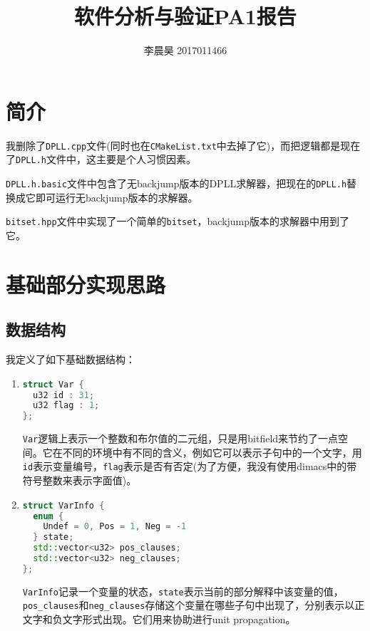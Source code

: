 \documentclass[12pt, UTF8]{article}
\title{软件分析与验证PA1报告}
\author{李晨昊 2017011466}
\begin{document}
\maketitle
\tableofcontents

\section{简介}

我删除了\lstinline|DPLL.cpp|文件(同时也在\lstinline|CMakeList.txt|中去掉了它)，而把逻辑都是现在了\lstinline|DPLL.h|文件中，这主要是个人习惯因素。

\lstinline|DPLL.h.basic|文件中包含了无backjump版本的DPLL求解器，把现在的\lstinline|DPLL.h|替换成它即可运行无backjump版本的求解器。

\lstinline|bitset.hpp|文件中实现了一个简单的\lstinline|bitset|，backjump版本的求解器中用到了它。

\section{基础部分实现思路}

\subsection{数据结构}

我定义了如下基础数据结构：

\begin{enumerate}
  \item
    \begin{lstlisting}[language = C++]
struct Var {
  u32 id : 31;
  u32 flag : 1;
};
    \end{lstlisting}

    \lstinline|Var|逻辑上表示一个整数和布尔值的二元组，只是用bitfield来节约了一点空间。它在不同的环境中有不同的含义，例如它可以表示子句中的一个文字，用\lstinline|id|表示变量编号，\lstinline|flag|表示是否有否定(为了方便，我没有使用dimacs中的带符号整数来表示字面值)。
  \item
    \begin{lstlisting}[language = C++]
struct VarInfo {
  enum {
    Undef = 0, Pos = 1, Neg = -1
  } state;
  std::vector<u32> pos_clauses;
  std::vector<u32> neg_clauses;
};
    \end{lstlisting}

    \lstinline|VarInfo|记录一个变量的状态，\lstinline|state|表示当前的部分解释中该变量的值，\lstinline|pos_clauses|和\lstinline|neg_clauses|存储这个变量在哪些子句中出现了，分别表示以正文字和负文字形式出现。它们用来协助进行unit propagation。
\end{enumerate}
\end{document}
